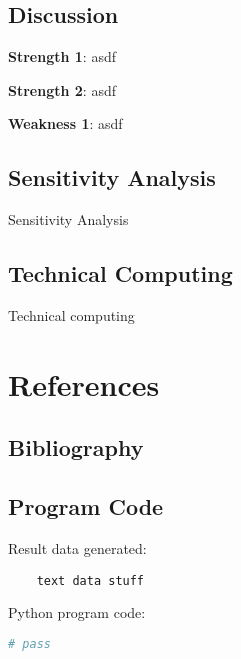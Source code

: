 \documentclass{mcm}
\numberwithin{figure}{section}
\numberwithin{table}{section}
\numberwithin{equation}{section}
\begin{document}
    \subsection{Discussion}
    
    \noindent\textbf{Strength 1}: asdf

    \noindent\textbf{Strength 2}: asdf

    \noindent\textbf{Weakness 1}: asdf

    \subsection{Sensitivity Analysis}
    Sensitivity Analysis

    \subsection{Technical Computing}
    Technical computing


    \newpage


    \section{References}

    \subsection{Bibliography}
    \printbibliography

    \subsection{Program Code}
    \noindent Result data generated:
    \begin{verbatim}
    text data stuff

    \end{verbatim}

    \noindent Python program code:
    \begin{lstlisting}[language=Python,label={lst:code}]
        # pass

    \end{lstlisting}
\end{document}
